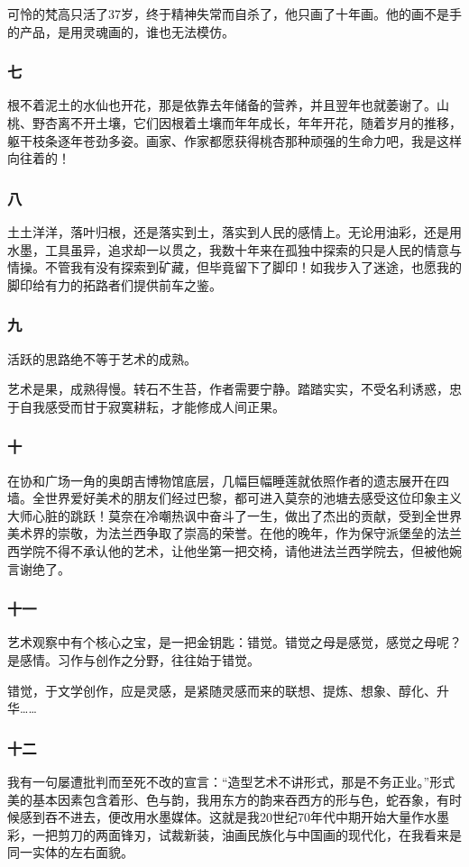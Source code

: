 \documentclass{article}
\begin{document}
可怜的梵高只活了37岁，终于精神失常而自杀了，他只画了十年画。他的画不是手的产品，是用灵魂画的，谁也无法模仿。
\subsubsection{七}
根不着泥土的水仙也开花，那是依靠去年储备的营养，并且翌年也就萎谢了。山桃、野杏离不开土壤，它们因根着土壤而年年成长，年年开花，随着岁月的推移，躯干枝条逐年苍劲多姿。画家、作家都愿获得桃杏那种顽强的生命力吧，我是这样向往着的！
\subsubsection{八}
土土洋洋，落叶归根，还是落实到土，落实到人民的感情上。无论用油彩，还是用水墨，工具虽异，追求却一以贯之，我数十年来在孤独中探索的只是人民的情意与情操。不管我有没有探索到矿藏，但毕竟留下了脚印！如我步入了迷途，也愿我的脚印给有力的拓路者们提供前车之鉴。
\subsubsection{九}
活跃的思路绝不等于艺术的成熟。

艺术是果，成熟得慢。转石不生苔，作者需要宁静。踏踏实实，不受名利诱惑，忠于自我感受而甘于寂寞耕耘，才能修成人间正果。
\subsubsection{十}
在协和广场一角的奥朗吉博物馆底层，几幅巨幅睡莲就依照作者的遗志展开在四墙。全世界爱好美术的朋友们经过巴黎，都可进入莫奈的池塘去感受这位印象主义大师心脏的跳跃！莫奈在冷嘲热讽中奋斗了一生，做出了杰出的贡献，受到全世界美术界的崇敬，为法兰西争取了崇高的荣誉。在他的晚年，作为保守派堡垒的法兰西学院不得不承认他的艺术，让他坐第一把交椅，请他进法兰西学院去，但被他婉言谢绝了。
\subsubsection{十一}
艺术观察中有个核心之宝，是一把金钥匙：错觉。错觉之母是感觉，感觉之母呢？是感情。习作与创作之分野，往往始于错觉。

错觉，于文学创作，应是灵感，是紧随灵感而来的联想、提炼、想象、醇化、升华……
\subsubsection{十二}
我有一句屡遭批判而至死不改的宣言：“造型艺术不讲形式，那是不务正业。”形式美的基本因素包含着形、色与韵，我用东方的韵来吞西方的形与色，蛇吞象，有时候感到吞不进去，便改用水墨媒体。这就是我20世纪70年代中期开始大量作水墨彩，一把剪刀的两面锋刃，试裁新装，油画民族化与中国画的现代化，在我看来是同一实体的左右面貌。
\end{document}
